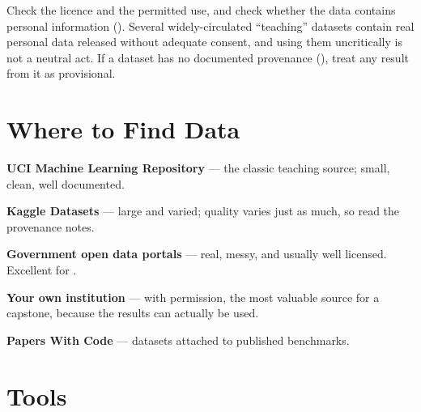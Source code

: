 \begin{alertbox}
Check the licence and the permitted use, and check whether the data contains
personal information (). Several widely-circulated ``teaching''
datasets contain real personal data released without adequate consent, and using
them uncritically is not a neutral act. If a dataset has no documented provenance
(), treat any result from it as provisional.
\end{alertbox}

\section{Where to Find Data}

\begin{tight}
  \item \textbf{UCI Machine Learning Repository} --- the classic teaching source;
        small, clean, well documented.
  \item \textbf{Kaggle Datasets} --- large and varied; quality varies just as much,
        so read the provenance notes.
  \item \textbf{Government open data portals} --- real, messy, and usually well
        licensed. Excellent for .
  \item \textbf{Your own institution} --- with permission, the most valuable source
        for a capstone, because the results can actually be used.
  \item \textbf{Papers With Code} --- datasets attached to published benchmarks.
\end{tight}

\section{Tools}

